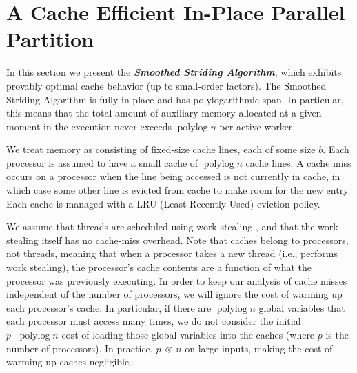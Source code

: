 \documentclass[twoside,leqno,twocolumn]{article}
\newcommand{\polylog}{\operatorname{polylog}}
\newcommand{\defn}[1]{{\textit{\textbf{\boldmath #1}}}}
\renewcommand{\paragraph}[1]{\vspace{0.09in}\noindent{\bf \boldmath #1.}}
\begin{document}
\section{A Cache Efficient In-Place Parallel Partition}\label{sec:smoothing}


In this section we present the \defn{Smoothed Striding Algorithm},
which exhibits provably optimal cache behavior (up to small-order
factors). The Smoothed Striding Algorithm is fully in-place and has
polylogarithmic span. In particular, this means that the total amount
of auxiliary memory allocated at a given moment in the execution never
exceeds $\polylog n$ per active worker.



\paragraph{Modeling Cache Misses}
We treat memory as consisting of fixed-size cache lines, each of some
size $b$. Each processor is assumed to have a small cache of
$\operatorname{polylog}{n}$ cache lines.  A cache miss occurs on a
processor when the line being accessed is not currently in cache, in
which case some other line is evicted from cache to make room for the
new entry.  Each cache is managed with a LRU (Least Recently Used)
eviction policy.

We assume that threads are scheduled using work stealing \cite{AcarBl00},
and that the work-stealing itself has no cache-miss overhead. Note
that caches belong to processors, not threads, meaning that when a
processor takes a new thread (i.e., performs work stealing), the
processor's cache contents are a function of what the processor was
previously executing. In order to keep our analysis of cache misses
independent of the number of processors, we will ignore the cost of
warming up each processor's cache. In particular, if there are
$\polylog n$ global variables that each processor must access many
times, we do not consider the initial $p \cdot \polylog n$ cost of
loading those global variables into the caches (where $p$ is the
number of processors). In practice, $p \ll n$ on large inputs, making
the cost of warming up caches negligible.
\end{document}
